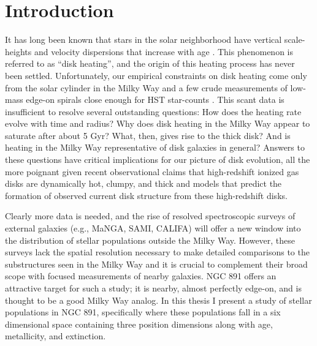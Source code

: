 \chapter[Introduction]{Introduction}
\label{chap:intro}


\clearpage It has long been known that stars in the solar neighborhood
have vertical scale-heights and velocity dispersions that increase
with age \citep[e.g.,][]{Wielen74}. This phenomenon is referred to as
``disk heating'', and the origin of this heating process has never
been settled. Unfortunately, our empirical constraints on disk heating
come only from the solar cylinder in the Milky Way and a few crude
measurements of low-mass edge-on spirals close enough for HST
star-counts \citep{Seth05a}. This scant data is insufficient to
resolve several outstanding questions: How does the heating rate
evolve with time and radius?  Why does disk heating in the Milky Way
appear to saturate after about 5 Gyr?  What, then, gives rise to the
thick disk?  And is heating in the Milky Way representative of disk
galaxies in general? Answers to these questions have critical
implications for our picture of disk evolution, all the more poignant
given recent observational claims that high-redshift ionized gas disks
are dynamically hot, clumpy, and thick \citep{Forster-Schreiber09} and
models \citep{Bird13} that predict the formation of observed current
disk structure from these high-redshift disks.

Clearly more data is needed, and the rise of resolved spectroscopic
surveys of external galaxies (e.g., MaNGA, SAMI, CALIFA) will offer a
new window into the distribution of stellar populations outside the
Milky Way. However, these surveys lack the spatial resolution
necessary to make detailed comparisons to the substructures seen in
the Milky Way and it is crucial to complement their broad scope with
focused measurements of nearby galaxies. NGC 891 offers an attractive
target for such a study; it is nearby, almost perfectly edge-on, and
is thought to be a good Milky Way analog. In this thesis I present a
study of stellar populations in NGC 891, specifically where these
populations fall in a six dimensional space containing three position
dimensions along with age, metallicity, and extinction.

